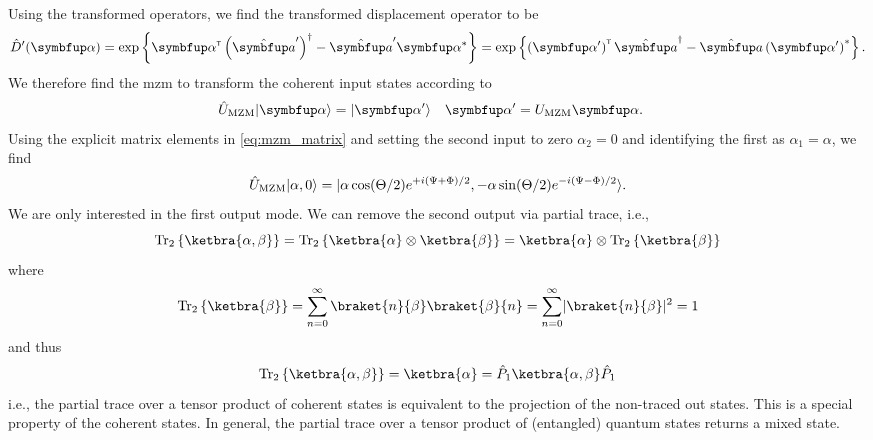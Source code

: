 Using the transformed operators, we find the transformed displacement operator to be~\cite[p.~210]{Vogel2006}
\begin{equation}
	\hat{D}^\prime(\vb{\alpha})
	=
	\exp\left\{
		\vb{\alpha}^\trans
		\left(\hat{\vb{a}}^\prime\right)^\dagger
		-
		\hat{\vb{a}}^\prime
		\vb{\alpha}^*
	\right\}
	=
	\exp\left\{
		\left(\vb{\alpha}^\prime\right)^\trans
		\hat{\vb{a}}^\dagger
		-
		\hat{\vb{a}}
		\left(\vb{\alpha}^\prime\right)^*
	\right\}
	.
\end{equation}
We therefore find the \gls{mzm} to transform the coherent input states according to
\begin{align}
	\hat{U}_\text{MZM}
	\ket{\vb{\alpha}}
	&=
	\ket{\vb{\alpha}^\prime}
	&
	\vb{\alpha}^\prime
	&=
	U_\text{MZM}
	\vb{\alpha}
	.
\end{align}
Using the explicit matrix elements in \cref{eq:mzm_matrix} and setting the second input to zero $\alpha_2=0$ and identifying the first as $\alpha_1=\alpha$, we find
\begin{equation}
	\hat{U}_\text{MZM}
	\lvert\alpha,0\rangle
	=
	\lvert\alpha\cos(\Theta/2)e^{+i(\Psi+\Phi)/2},-\alpha\sin(\Theta/2)e^{-i(\Psi-\Phi)/2}\rangle
	.
\end{equation}
We are only interested in the first output mode.
We can remove the second output via partial trace, i.e.,
\begin{equation}
	\trace_2\left\{
		\ketbra{\alpha,\beta}
	\right\}
	=
	\trace_2\left\{
		\ketbra{\alpha}
		\otimes
		\ketbra{\beta}
	\right\}
	=
	\ketbra{\alpha}
	\otimes
	\trace_2\left\{
		\ketbra{\beta}
	\right\}
\end{equation}
where
\begin{equation}
	\trace_2\left\{
		\ketbra{\beta}
	\right\}
	=
	\sum_{n=0}^\infty
	\braket{n}{\beta}
	\braket{\beta}{n}
	=
	\sum_{n=0}^\infty
	\abs{\braket{n}{\beta}}^2
	=
	1
\end{equation}
and thus
\begin{equation}
	\trace_2\left\{
		\ketbra{\alpha,\beta}
	\right\}
	=
	\ketbra{\alpha}
	=
	\hat{P}_1
	\ketbra{\alpha,\beta}
	\hat{P}_1
\end{equation}
i.e., the partial trace over a tensor product of coherent states is equivalent to the projection of the non-traced out states.
This is a special property of the coherent states.
In general, the partial trace over a tensor product of (entangled) quantum states returns a mixed state.
